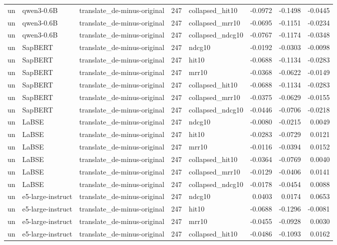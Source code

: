 \begin{tabular}{lllrlrrr}
un & qwen3-0.6B & translate\_de-minus-original & 247 & collapsed\_hit10 & -0.0972 & -0.1498 & -0.0445 \\
un & qwen3-0.6B & translate\_de-minus-original & 247 & collapsed\_mrr10 & -0.0695 & -0.1151 & -0.0234 \\
un & qwen3-0.6B & translate\_de-minus-original & 247 & collapsed\_ndcg10 & -0.0767 & -0.1174 & -0.0348 \\
un & SapBERT & translate\_de-minus-original & 247 & ndcg10 & -0.0192 & -0.0303 & -0.0098 \\
un & SapBERT & translate\_de-minus-original & 247 & hit10 & -0.0688 & -0.1134 & -0.0283 \\
un & SapBERT & translate\_de-minus-original & 247 & mrr10 & -0.0368 & -0.0622 & -0.0149 \\
un & SapBERT & translate\_de-minus-original & 247 & collapsed\_hit10 & -0.0688 & -0.1134 & -0.0283 \\
un & SapBERT & translate\_de-minus-original & 247 & collapsed\_mrr10 & -0.0375 & -0.0629 & -0.0155 \\
un & SapBERT & translate\_de-minus-original & 247 & collapsed\_ndcg10 & -0.0446 & -0.0706 & -0.0218 \\
un & LaBSE & translate\_de-minus-original & 247 & ndcg10 & -0.0080 & -0.0215 & 0.0049 \\
un & LaBSE & translate\_de-minus-original & 247 & hit10 & -0.0283 & -0.0729 & 0.0121 \\
un & LaBSE & translate\_de-minus-original & 247 & mrr10 & -0.0116 & -0.0394 & 0.0152 \\
un & LaBSE & translate\_de-minus-original & 247 & collapsed\_hit10 & -0.0364 & -0.0769 & 0.0040 \\
un & LaBSE & translate\_de-minus-original & 247 & collapsed\_mrr10 & -0.0129 & -0.0406 & 0.0141 \\
un & LaBSE & translate\_de-minus-original & 247 & collapsed\_ndcg10 & -0.0178 & -0.0454 & 0.0088 \\
un & e5-large-instruct & translate\_de-minus-original & 247 & ndcg10 & 0.0403 & 0.0174 & 0.0653 \\
un & e5-large-instruct & translate\_de-minus-original & 247 & hit10 & -0.0688 & -0.1296 & -0.0081 \\
un & e5-large-instruct & translate\_de-minus-original & 247 & mrr10 & -0.0455 & -0.0928 & 0.0030 \\
un & e5-large-instruct & translate\_de-minus-original & 247 & collapsed\_hit10 & -0.0486 & -0.1093 & 0.0162 \\

\end{tabular}
